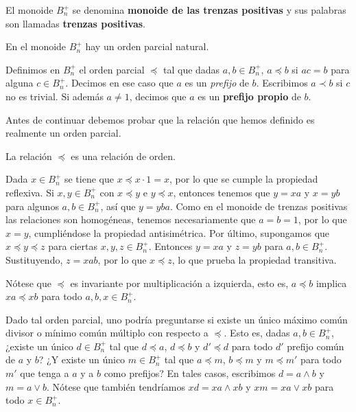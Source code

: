 \documentclass[bibtex, anon]{TEMat-article}
\begin{document}
\begin{definicion}
	El monoide $B_n^+$ se denomina \textbf{monoide de las trenzas positivas} y sus palabras son llamadas \textbf{trenzas positivas}.
\end{definicion}
En el monoide $B_n^+$ hay un orden parcial natural. 
\begin{definicion}
	Definimos en $B_n^+$ el orden parcial $\preccurlyeq$ tal que dadas $a,b\in B_n^+$, $a\preccurlyeq b$ si $ac=b$ para alguna $c\in B_n^+$. Decimos en ese caso que $a$ es un \emph{prefijo} de $b$. Escribimos $a\prec b$ si $c$ no es trivial. Si además $a\neq 1$, decimos que $a$ es un \textbf{prefijo propio} de $b$. 
\end{definicion}

Antes de continuar debemos probar que la relación que hemos definido es realmente un orden parcial.

\begin{lema}
	La relación $\preccurlyeq$ es una relación de orden.
\end{lema}
\begin{demostracion}
	Dada $x\in B_n^+$ se tiene que $x\preccurlyeq x\cdot 1=x$, por lo que se cumple la propiedad reflexiva. Si $x,y\in B_n^+$ con $x \preccurlyeq y $ e $y \preccurlyeq x$, entonces tenemos que $y=xa$ y $x=yb$ para algunos $a,b\in B_n^+$, así que $y=yba$. Como en el monoide de trenzas positivas las relaciones son homogéneas, tenemos necesariamente que $a=b=1$, por lo que $x=y$, cumpliéndose la propiedad antisimétrica. Por último, supongamos que $x\preccurlyeq y\preccurlyeq z$ para ciertas $x,y,z\in B_n^+$. Entonces $y=xa$ y $z=yb$ para $a,b\in B_n^+$. Sustituyendo, $z=xab$, por lo que $x\preccurlyeq z$, lo que prueba la propiedad transitiva. 
\end{demostracion}
Nótese que $\preccurlyeq$ es invariante por multiplicación a izquierda, esto es, $a\preccurlyeq b$ implica $xa\preccurlyeq xb$ para todo $a,b,x\in B_n^+$. %

Dado tal orden parcial, uno podría preguntarse si existe un único máximo común divisor o mínimo común múltiplo con respecto a $\preccurlyeq$. Esto es, dadas $a,b\in B_n^+$, ¿existe un único $d\in B_n^+$ tal que $d\preccurlyeq a$, $d\preccurlyeq b$ y $d'\preccurlyeq d$ para todo $d'$ prefijo común de $a$ y $b$? ¿Y existe un único $m\in B_n^+$ tal que $a\preccurlyeq m$, $b\preccurlyeq m$ y $m\preccurlyeq m'$ para todo $m'$ que tenga a $a$ y a $b$ como prefijos? En tales casos, escribimos $d=a\land b$ y $m=a\lor b$. Nótese que también tendríamos $xd=xa\land xb$ y $xm=xa\lor xb$ para todo $x\in B_n^+$.
\end{document}
